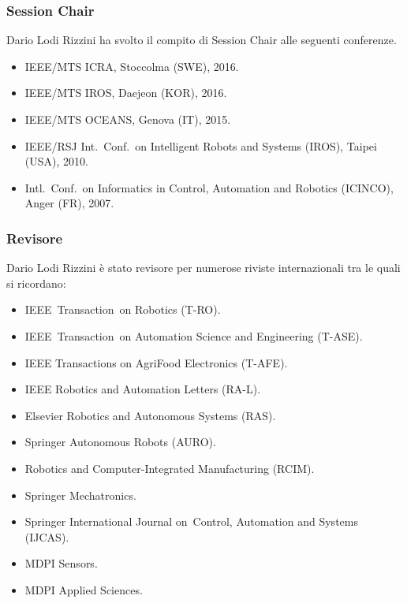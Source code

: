 \documentclass[11pt]{article}
\begin{document}
\begin{itemize}
\subsubsection*{Session Chair}

Dario Lodi Rizzini ha svolto il compito di Session Chair alle seguenti conferenze.
\begin{itemize}
\item IEEE/MTS ICRA, Stoccolma (SWE), 2016. 
\item IEEE/MTS IROS, Daejeon (KOR), 2016. 
\item IEEE/MTS OCEANS, Genova (IT), 2015. 
\item IEEE/RSJ Int.~Conf.~on Intelligent Robots and Systems (IROS), Taipei (USA), 2010.
\item Intl.~Conf.~on Informatics in Control, Automation and Robotics (ICINCO), Anger (FR), 2007.
\end{itemize}


\subsubsection*{Revisore}

Dario Lodi Rizzini \`e stato revisore per numerose riviste internazionali tra le quali si ricordano:
\begin{itemize}
\item IEEE~Transaction~on Robotics (T-RO).
\item IEEE~Transaction~on Automation Science and Engineering (T-ASE).
\item IEEE Transactions on AgriFood Electronics (T-AFE).
\item IEEE Robotics and Automation Letters (RA-L). 
\item Elsevier Robotics and Autonomous Systems (RAS).
\item Springer Autonomous Robots (AURO).
\item Robotics and Computer-Integrated Manufacturing (RCIM). 
\item Springer Mechatronics.
\item Springer International Journal on~Control, Automation and Systems (IJCAS).
\item MDPI Sensors. 
\item MDPI Applied Sciences. 
\end{itemize}


\end{itemize}
\end{document}
